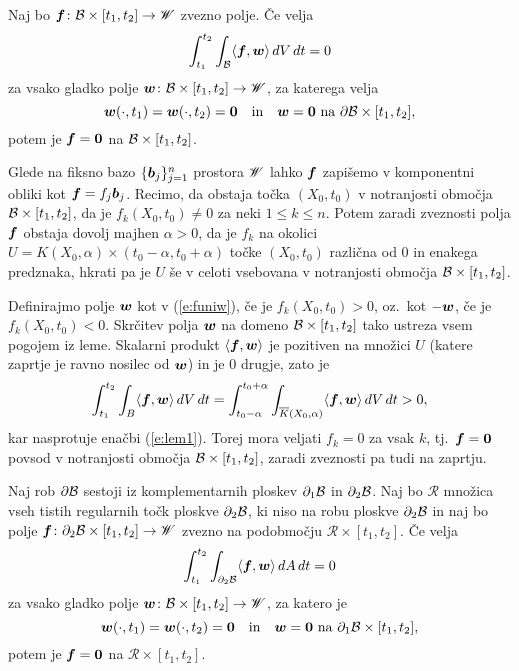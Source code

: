 \begin{lema}\label{l:1}
	Naj bo $\boldsymbol f\colon\mathcal B\times [t_1,t_2]\to\mathscr W$ zvezno polje. Če velja
	\begin{equation}\label{e:lem1}
		\int_{t_1}^{t_2}\int_{\mathcal B}\langle\boldsymbol f,\boldsymbol w\rangle\,dV\,dt = 0
	\end{equation}
	za vsako gladko polje $\boldsymbol w\colon\mathcal B\times[t_1,t_2]\to\mathscr W$, za katerega velja
	\[
		\boldsymbol w(\cdot,t_1)=\boldsymbol w(\cdot,t_2)=\boldsymbol 0\quad\textrm{in}
		\quad\boldsymbol w=\boldsymbol 0\ \textrm{na}\ \partial \mathcal B\times[t_1,t_2],
	\]
	potem je $\boldsymbol f=\boldsymbol 0$ na $\mathcal B\times [t_1,t_2]$.
\end{lema}

\proof
	Glede na fiksno bazo $\{\boldsymbol b_j\}_{j=1}^n$ prostora $\mathscr W$ lahko $\boldsymbol f$
	zapišemo v komponentni obliki kot $\boldsymbol f=f_j\boldsymbol b_j$.
	Recimo, da obstaja točka $(X_0,t_0)$ v notranjosti območja $\mathcal B\times[t_1,t_2]$, da je $f_{k}(X_0,t_0)\neq 0$
	za neki $1\leq k\leq n$.
	Potem zaradi zveznosti polja $\boldsymbol f$ obstaja dovolj majhen $\alpha>0$, da je $f_k$ na okolici
	$U=K(X_0,\alpha)\times(t_0-\alpha,t_0+\alpha)$ točke $(X_0,t_0)$ različna
	od 0 in enakega predznaka, hkrati pa je $U$ še v celoti vsebovana v notranjosti območja $\mathcal B\times[t_1,t_2]$.
	
	Definirajmo polje
	$\boldsymbol w$ kot v (\ref{e:funiw}), če je $f_{k}(X_0,t_0) > 0$, oz.~kot $-\boldsymbol w$,
	če je $f_{k}(X_0,t_0) < 0$.
	Skrčitev polja $\boldsymbol w$ na domeno $\mathcal B\times[t_1,t_2]$ tako ustreza vsem pogojem iz leme.
	Skalarni produkt $\langle\boldsymbol f,\boldsymbol w\rangle$ je pozitiven na množici $U$ (katere zaprtje
	je ravno nosilec od $\boldsymbol w$) in je 0 drugje, zato je
	\[
		\int_{t_1}^{t_2}\int_B \langle\boldsymbol f,\boldsymbol w\rangle\,dV\,dt=
		\int_{t_0-\alpha}^{t_0+\alpha}\int_{\overline{K}(X_0,\alpha)} \langle\boldsymbol f,\boldsymbol w\rangle\,dV\,dt> 0,
	\]
	kar nasprotuje enačbi (\ref{e:lem1}). Torej mora veljati $f_k=0$ za vsak $k$,
	tj.~$\boldsymbol f=\boldsymbol 0$ povsod v notranjosti območja $\mathcal B\times [t_1,t_2]$,
	zaradi zveznosti pa tudi na zaprtju.
\endproof

\begin{lema}\label{l:2}
	Naj rob $\partial\mathcal B$ sestoji iz komplementarnih ploskev $\partial_1 \mathcal B$ in
	$\partial_2 \mathcal B$. Naj bo $\mathcal{R}$ množica vseh tistih regularnih točk ploskve $\partial_2\mathcal B$,
	ki niso na robu ploskve $\partial_2\mathcal B$ in naj bo 
	polje $\boldsymbol f\colon \partial_2\mathcal B\times[t_1,t_2]\to \mathscr W$ zvezno na podobmočju $\mathcal{R}\times[t_1,t_2]$.
	Če velja
	\begin{equation}\label{e:lem2}
		\int_{t_1}^{t_2}\int_{\partial_2\mathcal B} \langle\boldsymbol f,\boldsymbol w\rangle\,dA\,dt = 0
	\end{equation}
	za vsako gladko polje $\boldsymbol w\colon\mathcal B\times[t_1,t_2]\to\mathscr W$, za katero je
	\[
		\vek{w}(\cdot,t_1)=\vek{w}(\cdot,t_2)=\vek{0}\quad\textrm{in}
		\quad\vek{w}=\vek{0}\ \textrm{na}\ \partial_1\B\times[t_1,t_2],
	\]
	potem je $\boldsymbol f=\boldsymbol 0$ na $\mathcal{R}\times [t_1,t_2]$.
\end{lema}

